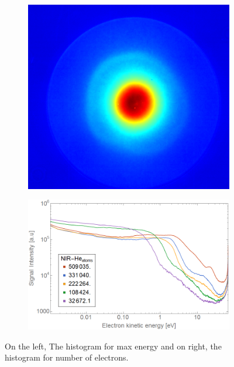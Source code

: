\begin{figure}[h!]
\centering
\begin{subfigure}[l]{0.4\textwidth}
\includegraphics[width=1\textwidth]{../Images/results/Comparison_energyDistribution/NIr_He_12K.png}   				\end{subfigure}
\begin{subfigure}[l]{0.59\textwidth}
\includegraphics[width=1\textwidth]{../Images/results/Comparison_energyDistribution/NIR_He_summed_energydist.png} 
\end{subfigure}

\caption[MIR He droplet scan histograms]{On the left, The histogram for max energy and on right, the histogram for number of electrons.}
\label{fig:NIrsummed}
\end{figure}


